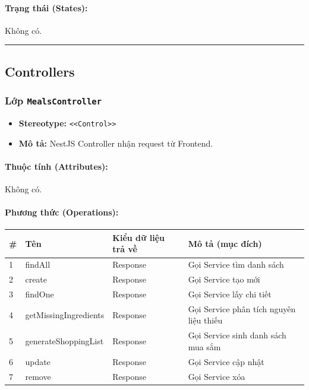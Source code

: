 \documentclass[12pt,a4paper]{article}
\begin{document}
\paragraph{Trạng thái (States):}
Không có.

\vskip 0.5cm
\noindent\rule{\textwidth}{0.5pt}
\vskip 0.5cm

\subsection{Controllers}


\subsubsection{Lớp \texttt{MealsController}}

\begin{itemize}[leftmargin=*]
    \item \textbf{Stereotype:} \texttt{\textless{}\textless{}Control\textgreater{}\textgreater{}}
    \item \textbf{Mô tả:} NestJS Controller nhận request từ Frontend.
\end{itemize}

\paragraph{Thuộc tính (Attributes):}
Không có.

\paragraph{Phương thức (Operations):}
\begin{longtable}{|p{0.6cm}|p{5.0cm}|p{2.8cm}|p{5.4cm}|}
\hline
\textbf{\#} & \textbf{Tên} & \textbf{Kiểu dữ liệu trả về} & \textbf{Mô tả (mục đích)} \\ \hline
\endhead
1 & findAll & Response & Gọi Service tìm danh sách \\ \hline
2 & create & Response & Gọi Service tạo mới \\ \hline
3 & findOne & Response & Gọi Service lấy chi tiết \\ \hline
4 & getMissingIngredients & Response & Gọi Service phân tích nguyên liệu thiếu \\ \hline
5 & generateShoppingList & Response & Gọi Service sinh danh sách mua sắm \\ \hline
6 & update & Response & Gọi Service cập nhật \\ \hline
7 & remove & Response & Gọi Service xóa \\ \hline
\end{longtable}
\end{document}
